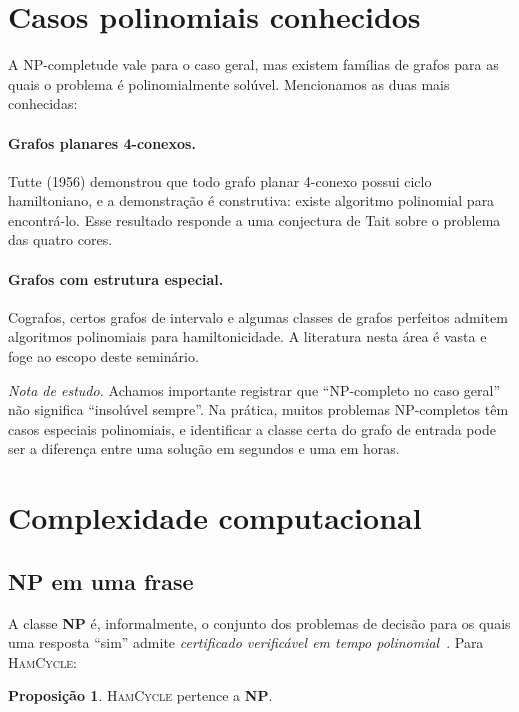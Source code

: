 \documentclass[11pt,a4paper]{article}
\theoremstyle{definition}
\newtheorem{prop}[teo]{Proposição}
\newcommand{\nota}[1]{%
  \par\medskip
  {\small\color{notagray}\textit{Nota de estudo.} #1}\par\medskip
}
\begin{document}
\section{Casos polinomiais conhecidos}

A NP-completude vale para o caso geral, mas existem famílias de grafos para as quais o problema é polinomialmente solúvel. Mencionamos as duas mais conhecidas:

\paragraph{Grafos planares 4-conexos.} Tutte (1956) demonstrou que todo grafo planar 4-conexo possui ciclo hamiltoniano, e a demonstração é construtiva: existe algoritmo polinomial para encontrá-lo. Esse resultado responde a uma conjectura de Tait sobre o problema das quatro cores.

\paragraph{Grafos com estrutura especial.} Cografos, certos grafos de intervalo e algumas classes de grafos perfeitos admitem algoritmos polinomiais para hamiltonicidade. A literatura nesta área é vasta e foge ao escopo deste seminário.

\nota{Achamos importante registrar que ``NP-completo no caso geral'' não significa ``insolúvel sempre''. Na prática, muitos problemas NP-completos têm casos especiais polinomiais, e identificar a classe certa do grafo de entrada pode ser a diferença entre uma solução em segundos e uma em horas.}

\section{Complexidade computacional}

\subsection{NP em uma frase}

A classe \textbf{NP} é, informalmente, o conjunto dos problemas de decisão para os quais uma resposta ``sim'' admite \emph{certificado verificável em tempo polinomial}~\citep{sipser2005}. Para \textsc{HamCycle}:

\begin{prop}
\textsc{HamCycle} pertence a \textbf{NP}.
\end{prop}
\end{document}
